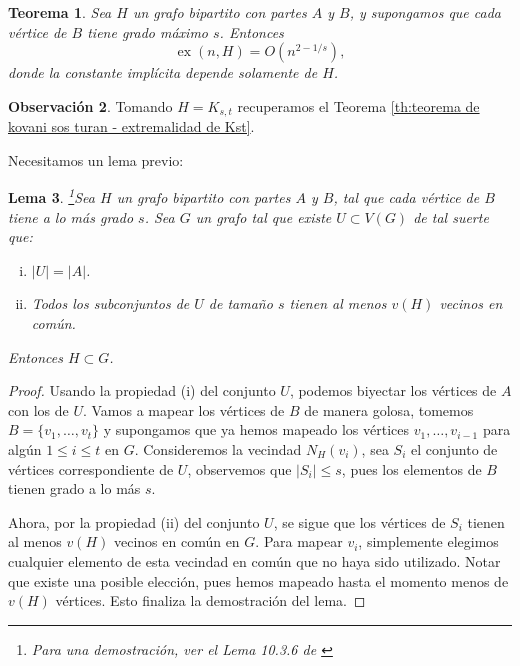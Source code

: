 \documentclass[12pt]{report}
\theoremstyle{plain}
\newtheorem{theorem}{Teorema}[section]
\newtheorem{lemma}[theorem]{Lema}
\theoremstyle{definition}
\newtheorem{obs}[theorem]{Observación}
\newcommand{\abs}[1]{\left \vert #1 \right \vert}
\newcommand{\ex}[2]{\operatorname{ex} (#1, #2)}
\begin{document}
\begin{theorem}
Sea $H$ un grafo bipartito con partes $A$ y $B$, y supongamos que cada vértice de $B$ tiene grado máximo $s$. Entonces
\[
\ex{n}{H} = O (n^{2- 1 / s}),
\]
donde la constante implícita depende solamente de $H$.
\end{theorem}

\begin{obs}
Tomando $H = K_{s,t}$ recuperamos el Teorema \ref{th:teorema de kovani sos turan - extremalidad de Kst}.
\end{obs}


Necesitamos un lema previo:
\begin{lemma}\footnote{
Para una demostración, ver el Lema 10.3.6 de \cite{botler2022combinatoria}
}\label{lema:un lema sobre grafos bipartitos H para probar resultado del metodo probabilistico y numero extremal de H}
Sea $H$ un grafo bipartito con partes $A$ y $B$, tal que cada vértice de $B$ tiene a lo más grado $s$. Sea $G$ un grafo tal que existe $U \subset V(G)$ de tal suerte que:
\begin{enumerate}[(i)]
\item $\abs U = \abs A$.
\item Todos los subconjuntos de $U$ de tamaño $s$ tienen al menos $v(H)$ vecinos en común.
\end{enumerate}
Entonces $H \subset G$.
\end{lemma}
\begin{proof}
Usando la propiedad (i) del conjunto $U$, podemos biyectar los vértices de $A$ con los de $U$. Vamos a mapear los vértices de $B$ de manera golosa, tomemos $B = \{v_1, \ldots, v_t\}$ y supongamos que ya hemos mapeado los vértices $v_1, \ldots, v_{i-1}$ para algún $1 \leq i \leq t$ en $G$. Consideremos la vecindad $N_H (v_i)$, sea $S_i$ el conjunto de vértices correspondiente de $U$, observemos que $\abs{S_i} \leq s$, pues los elementos de $B$ tienen grado a lo más $s$.

Ahora, por la propiedad (ii) del conjunto $U$, se sigue que los vértices de $S_i$ tienen al menos $v(H)$ vecinos en común en $G$. Para mapear $v_i$, simplemente elegimos cualquier elemento de esta vecindad en común que no haya sido utilizado. Notar que existe una posible elección, pues hemos mapeado hasta el momento menos de $v(H)$ vértices. Esto finaliza la demostración del lema.
\end{proof}
\end{document}
